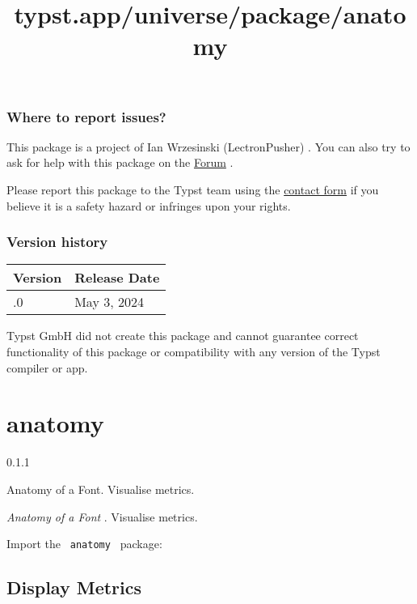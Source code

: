 \subsubsection{Where to report issues?}\label{where-to-report-issues}

This package is a project of Ian Wrzesinski (LectronPusher) . You can
also try to ask for help with this package on the
\href{https://forum.typst.app}{Forum} .

Please report this package to the Typst team using the
\href{https://typst.app/contact}{contact form} if you believe it is a
safety hazard or infringes upon your rights.

\label{versions}
\subsubsection{Version history}\label{version-history}

\begin{longtable}[]{@{}ll@{}}
\toprule\noalign{}
Version & Release Date \\
\midrule\noalign{}
\endhead
\bottomrule\noalign{}
\endlastfoot
0.1.0 & May 3, 2024 \\
\end{longtable}

Typst GmbH did not create this package and cannot guarantee correct
functionality of this package or compatibility with any version of the
Typst compiler or app.


\title{typst.app/universe/package/anatomy}

\label{banner}
\section{anatomy}\label{anatomy}

{ 0.1.1 }

Anatomy of a Font. Visualise metrics.

\label{readme}
\emph{Anatomy of a Font} . Visualise metrics.

Import the \texttt{\ anatomy\ } package:

\begin{Shaded}
\begin{Highlighting}[]
\end{Highlighting}
\end{Shaded}

\subsection{Display Metrics}\label{display-metrics}

